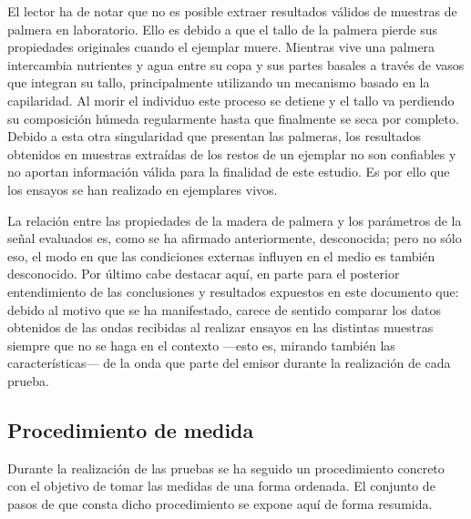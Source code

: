 El lector ha de notar que no es posible extraer resultados válidos de
muestras de palmera en laboratorio. Ello es debido a que el tallo de la
palmera pierde sus propiedades originales cuando el ejemplar muere.
Mientras vive una palmera intercambia nutrientes y agua entre su copa y sus
partes basales a través de vasos que integran su tallo, principalmente
utilizando un mecanismo basado en la capilaridad. Al morir el individuo
este proceso se detiene y el tallo va perdiendo su composición húmeda
regularmente hasta que finalmente se seca por completo. Debido a esta otra
singularidad que presentan las palmeras, los resultados obtenidos en
muestras extraídas de los restos de un ejemplar no son confiables y no
aportan información válida para la finalidad de este estudio. Es por ello
que los ensayos se han realizado en ejemplares vivos.

La relación entre las propiedades de la madera de palmera y los parámetros
de la señal evaluados es, como se ha afirmado anteriormente, desconocida;
pero no sólo eso, el modo en que las condiciones externas influyen en el
medio es también desconocido. Por último cabe destacar aquí, en parte para
el posterior entendimiento de las conclusiones y resultados expuestos en
este documento que: debido al motivo que se ha manifestado, carece de
sentido comparar los datos obtenidos de las ondas recibidas al realizar
ensayos en las distintas muestras siempre que no se haga en el contexto
---esto es, mirando también las características--- de la onda que parte del
emisor durante la realización de cada prueba.


\subsection{Procedimiento de medida}

Durante la realización de las pruebas se ha seguido un procedimiento
concreto con el objetivo de tomar las medidas de una forma ordenada. El
conjunto de pasos de que consta dicho procedimiento se expone aquí de
forma resumida.

